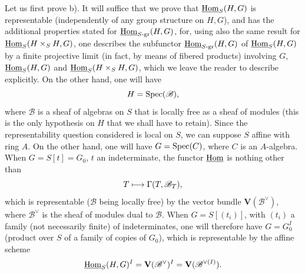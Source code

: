 Let us first prove b). It will suffice that we prove that $\underline{\operatorname{Hom}}_S(H,G)$ is representable (independently of any group structure on $H,G$), and has the additional properties stated for $\underline{\operatorname{Hom}}_{S\text{-gr}}(H,G)$, for, using also the same result for $\underline{\operatorname{Hom}}_S(H\times_S H,G)$, one describes the subfunctor $\underline{\operatorname{Hom}}_{S\text{-gr}}(H,G)$ of $\underline{\operatorname{Hom}}_S(H,G)$ by a finite projective limit (in fact, by means of fibered products) involving $G$, $\underline{\operatorname{Hom}}_S(H,G)$ and $\underline{\operatorname{Hom}}_S(H\times_S H,G)$, which we leave the reader to describe explicitly. On the other hand, one will have
\[
H=\operatorname{Spec}(\mathscr B),
\]
where $\mathscr B$ is a sheaf of algebras on $S$ that is locally free as a sheaf of modules (this is the only hypothesis on $H$ that we shall have to retain). Since the representability question considered is local on $S$, we can suppose $S$ affine with ring $A$. On the other hand, one will have $G=\operatorname{Spec}(C)$, where $C$ is an $A$-algebra. When $G=S[t]=G_0$, $t$ an indeterminate, the functor $\underline{\operatorname{Hom}}$ is nothing other than
\[
T\longmapsto\Gamma(T,\mathscr B_T),
\]
which is representable ($\mathscr B$ being locally free) by the vector bundle $\mathbf V(\mathscr B^\vee)$, where $\mathscr B^\vee$ is the sheaf of modules dual to $\mathscr B$. When $G=S[(t_i)]$, with $(t_i)$ a family (not necessarily finite) of indeterminates, one will therefore have $G=G_0^I$ (product over $S$ of a family of copies of $G_0$), which is representable by the affine scheme
\[
\underline{\operatorname{Hom}}_S(H,G)^I=\mathbf V(\mathscr B^\vee)^I=\mathbf V(\mathscr B^{\vee(I)}).
\]
